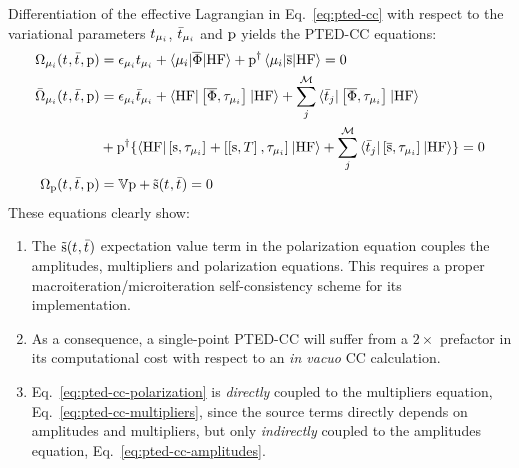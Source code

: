 Differentiation of the effective Lagrangian in Eq.~\eqref{eq:pted-cc}
with respect to the variational parameters $t_{\mu_i}$,
$\bar{t}_{\mu_i}$ and $\mathrm{p}$ yields the \acs{PTED}-\acs{CC}
equations:
\begin{subequations}
  \begin{align}
   \Omega_{\mu_i}(t_{}, \bar{t}_{}, \mathrm{p})  &=
   \epsilon_{\mu_i}t_{\mu_i} + \braket{\mu_i | \overline{\Phi} | \mathrm{HF}}
   + \mathrm{p}^\dagger\braket{\mu_i | \overline{\mathrm{s}} | \mathrm{HF}}
             = 0 \label{eq:pted-cc-amplitudes}\\
   \bar{\Omega}_{\mu_i}(t_{}, \bar{t}_{}, \mathrm{p})
    &=
    \epsilon_{\mu_i}\bar{t}_{\mu_i} +
    \braket{\mathrm{HF} | \left[ \overline{\Phi}, \tau_{\mu_i} \right]^{} | \mathrm{HF}} +
    \sum_{j}^{\mathcal{M}}\braket{\bar{t}_{j} |
    \left[ \overline{\Phi}, \tau_{\mu_i} \right]^{} | \mathrm{HF}}
    \nonumber \\
    &+ \mathrm{p}^\dagger\lbrace
    \braket{\mathrm{HF} | \left[ \mathrm{s}, \tau_{\mu_i} \right]^{} +
    \left[ \left[ \mathrm{s}, T \right]^{}, \tau_{\mu_i} \right]^{}| \mathrm{HF}} +
    \sum_{j}^{\mathcal{M}}\braket{\bar{t}_{j} | \left[ \overline{\mathrm{s}}, \tau_{\mu_i} \right]^{} | \mathrm{HF}}
             \rbrace
             = 0 \label{eq:pted-cc-multipliers}\\
    \Omega_{\mathrm{p}}(t_{}, \bar{t}_{}, \mathrm{p})
    &=
    \mathbb{V}\mathrm{p} + \tilde{\mathrm{s}}(t_{}, \bar{t}_{}) = 0
    \label{eq:pted-cc-polarization}
  \end{align}
\end{subequations}
These equations clearly show:
\begin{enumerate}
  \item The $\tilde{\mathrm{s}}(t_{}, \bar{t}_{})$ expectation value term in the
    polarization equation couples the amplitudes, multipliers and
    polarization equations.
    This requires a proper macroiteration/microiteration
    self-consistency scheme for its implementation.~\autocite{Cammi2009-gu, Caricato2010-hx}
  \item As a consequence, a single-point \acs{PTED}-\acs{CC} will
    suffer from a $2\times$ prefactor in its computational cost with
    respect to an \emph{in vacuo} \acs{CC} calculation.
  \item Eq.~\eqref{eq:pted-cc-polarization} is \emph{directly} coupled to
    the multipliers equation, Eq.~\eqref{eq:pted-cc-multipliers}, since
    the source terms directly depends on amplitudes and multipliers, but
    only \emph{indirectly} coupled to the amplitudes equation,
    Eq.~\eqref{eq:pted-cc-amplitudes}.
\end{enumerate}

